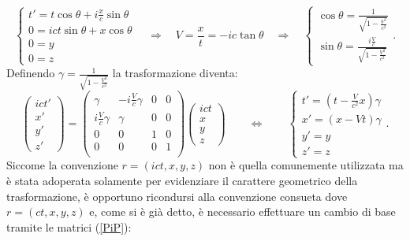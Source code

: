 \begin{equation*}
    \begin{cases}
        t'=t\cos\theta+i\frac{x}{c}\sin\theta\\
        0=ict\sin\theta+x\cos\theta\\
        0=y\\
        0=z
       \end{cases}
    \quad \Rightarrow \quad
    V=\frac{x}{t}=-ic\tan\theta \quad \Rightarrow \quad
    \begin{cases}
        \cos\theta=\frac{1}{\sqrt{1-\frac{V^2}{c^2}}}\\
        \sin\theta=\frac{i\frac{V}{c}}{\sqrt{1-\frac{V^2}{c^2}}}
    \end{cases}.
\end{equation*}
Definendo $\gamma=\frac{1}{\sqrt{1-\frac{V^2}{c^2}}}$ la trasformazione diventa:
\begin{equation*}
    \begin{pmatrix}
     ict'\\x'\\y'\\z'
    \end{pmatrix}
    =\begin{pmatrix}
     \gamma & -i\frac{V}{c}\gamma & 0 & 0\\
     i\frac{V}{c}\gamma & \gamma & 0 & 0\\
     0& 0 & 1 & 0\\
     0& 0 & 0 & 1\\
    \end{pmatrix}
    \begin{pmatrix}
     ict\\x\\y\\z
    \end{pmatrix}\qquad
    \Leftrightarrow   \qquad
    \begin{cases}
     t'=(t-\frac{V}{c^2}x)\gamma\\
     x'=(x-Vt)\gamma\\
     y'=y\\
     z'=z
    \end{cases}.
 \end{equation*}
 Siccome la convenzione $r=(ict,x,y,z)$ non è quella comunemente utilizzata ma è stata adoperata solamente per evidenziare il carattere geometrico della trasformazione, è opportuno ricondursi alla convenzione consueta dove $r=(ct,x,y,z)$ e, come si è già detto, è necessario effettuare un cambio di base tramite le matrici (\ref{PiP}):
